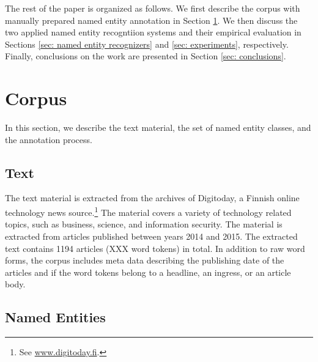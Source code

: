 \documentclass[11pt]{article}
\begin{document}



The rest of the paper is organized as follows. We first describe the corpus with manually prepared named entity annotation in Section \ref{sec: corpus}. We then discuss the two applied named entity recogntiion systems and their empirical evaluation in Sections \ref{sec: named entity recognizers} and \ref{sec: experiments}, respectively.  
Finally, conclusions on the work are presented in Section \ref{sec: conclusions}.




\section{Corpus}
\label{sec: corpus}

In this section, we describe the text material, the set of named entity classes, and the annotation process.

\subsection{Text}
\label{sec: text}

The text material is extracted from the archives of Digitoday, a Finnish online technology news source.\footnote{See \url{www.digitoday.fi}.} The material covers a variety of technology related topics, such as business, science, and information security.  The material is extracted from articles published between years 2014 and 2015. The extracted text contains 1194 articles (XXX word tokens) in total. In addition to raw word forms, the corpus includes meta data describing the publishing date of the articles and if the word tokens belong to a headline, an ingress, or an article body. 


\subsection{Named Entities}
\label{sec: named entities}
\end{document}
